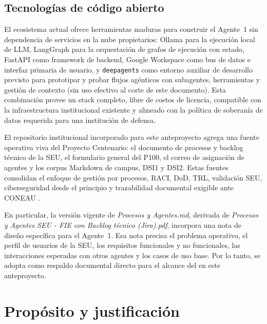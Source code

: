 \documentclass[a4paper, 12pt]{article}
\begin{document}
\subsection{Tecnolog\'ias de c\'odigo abierto}

El ecosistema actual ofrece herramientas maduras para construir el Agente~1 sin dependencia de servicios en la nube propietarios: Ollama \parencite{ollama2024} para la ejecuci\'on local de \ac{LLM}, LangGraph \parencite{langgraph2026} para la orquestaci\'on de grafos de ejecuci\'on con estado, FastAPI \parencite{fastapi2024} como framework de backend, Google Workspace como bus de datos e interfaz primaria de usuario, y \texttt{deepagents} \parencite{deepagents2026} como entorno auxiliar de desarrollo previsto para prototipar y probar flujos ag\'enticos con subagentes, herramientas y gesti\'on de contexto (sin uso efectivo al corte de este documento). Esta combinaci\'on provee un stack completo, libre de costos de licencia, compatible con la infraestructura institucional existente y alineado con la pol\'itica de soberan\'ia de datos requerida para una instituci\'on de defensa.

El repositorio institucional incorporado para este anteproyecto agrega una fuente operativa viva del Proyecto Centenario: el documento de procesos y backlog t\'ecnico de la \ac{SEU}, el formulario general del \ac{P100}, el correo de asignaci\'on de agentes y los corpus Markdown de campus, DSI1 y DSI2. Estas fuentes consolidan el enfoque de gesti\'on por procesos, \ac{RACI}, \ac{DoD}, \ac{TRL}, validaci\'on \ac{SEU}, ciberseguridad desde el principio y trazabilidad documental exigible ante \ac{CONEAU} \parencite{cicerchia2026proyecto,cicerchia2026procesos}.

En particular, la versi\'on vigente de \textit{Procesos y Agentes.md}, derivada de \textit{Procesos y Agentes SEU - FIE con Backlog t\'ecnico (Jira).pdf}, incorpora una nota de dise\~no espec\'ifica para el Agente~1. Esa nota precisa el problema operativo, el perfil de usuarios de la \ac{SEU}, los requisitos funcionales y no funcionales, las interacciones esperadas con otros agentes y los casos de uso base. Por lo tanto, se adopta como respaldo documental directo para el alcance del \agenteUno{} en este anteproyecto.

\section{Prop\'osito y justificaci\'on}
\end{document}
